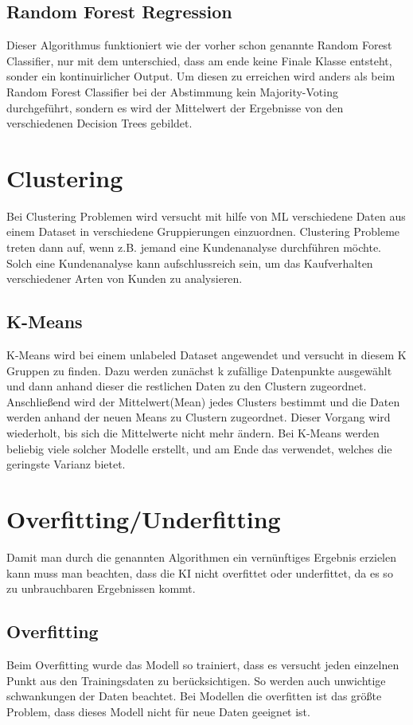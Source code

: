 \subsection{Random Forest Regression}
\label{sec:randomForestRegression}
Dieser Algorithmus funktioniert wie der vorher schon genannte Random Forest Classifier, nur mit dem unterschied, dass am ende keine Finale Klasse entsteht, sonder ein kontinuirlicher Output. Um diesen zu erreichen wird anders als beim Random Forest Classifier bei der Abstimmung kein Majority-Voting durchgeführt, sondern es wird der Mittelwert der Ergebnisse von den verschiedenen Decision Trees gebildet.

\section{Clustering}
\label{sec:clustering}
Bei Clustering Problemen wird versucht mit hilfe von \ac{ML} verschiedene Daten aus einem Dataset in verschiedene Gruppierungen einzuordnen\cite[S.~5.]{WML}. Clustering Probleme treten dann auf, wenn z.B. jemand eine Kundenanalyse durchführen möchte. Solch eine Kundenanalyse kann aufschlussreich sein, um das Kaufverhalten verschiedener Arten von Kunden zu analysieren.


\subsection{K-Means}
\label{sec:kMeans}
K-Means wird bei einem unlabeled Dataset angewendet und versucht in diesem K Gruppen zu finden. Dazu werden zunächst k zufällige Datenpunkte ausgewählt und dann anhand dieser die restlichen Daten zu den Clustern zugeordnet. Anschließend wird der Mittelwert(Mean) jedes Clusters bestimmt und die Daten werden anhand der neuen Means zu Clustern zugeordnet. Dieser Vorgang wird wiederholt, bis sich die Mittelwerte nicht mehr ändern. Bei K-Means werden beliebig viele solcher Modelle erstellt, und am Ende das verwendet, welches die geringste Varianz bietet\cite[S.~222.]{WML}.


\section{Overfitting/Underfitting}
\label{sec:overfittingUnderfitting}
Damit man durch die genannten Algorithmen ein vernünftiges Ergebnis erzielen kann muss man beachten, dass die KI nicht overfittet oder underfittet, da es so zu unbrauchbaren Ergebnissen kommt.


\subsection{Overfitting}
\label{sec:overfitting}
Beim Overfitting wurde das Modell so trainiert, dass es versucht jeden einzelnen Punkt aus den Trainingsdaten zu berücksichtigen. So werden auch unwichtige schwankungen der Daten beachtet. Bei Modellen die overfitten ist das größte Problem, dass dieses Modell nicht für neue Daten geeignet ist\cite[S.~214.]{WML}.


